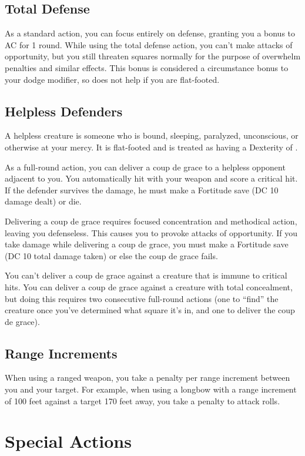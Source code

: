 \subsection{Total Defense}\label{Total Defense}
As a standard action, you can focus entirely on defense, granting you a  bonus to AC for 1 round. While using the total defense action, you can't make attacks of opportunity, but you still threaten squares normally for the purpose of overwhelm penalties and similar effects. This bonus is considered a circumstance bonus to your dodge modifier, so does not help if you are flat-footed.

\subsection{Helpless Defenders}
A helpless creature is someone who is bound, sleeping, paralyzed, unconscious, or otherwise at your mercy. It is flat-footed and is treated as having a Dexterity of .

\label{Coup de Grace} As a full-round action, you can deliver a coup de grace to a helpless opponent adjacent to you. You automatically hit with your weapon and score a critical hit. If the defender survives the damage, he must make a Fortitude save (DC 10 \add damage dealt) or die.

Delivering a coup de grace requires focused concentration and methodical action, leaving you defenseless. This causes you to provoke attacks of opportunity. If you take damage while delivering a coup de grace, you must make a Fortitude save (DC 10 \add total damage taken) or else the coup de grace fails.

You can't deliver a coup de grace against a creature that is immune to critical hits. You can deliver a coup de grace against a creature with total concealment, but doing this requires two consecutive full-round actions (one to ``find'' the creature once you've determined what square it's in, and one to deliver the coup de grace).

\subsection{Range Increments}
When using a ranged weapon, you take a  penalty per range increment between you and your target. For example, when using a longbow with a range increment of 100 feet against a target 170 feet away, you take a  penalty to attack rolls.

\section{Special Actions}

